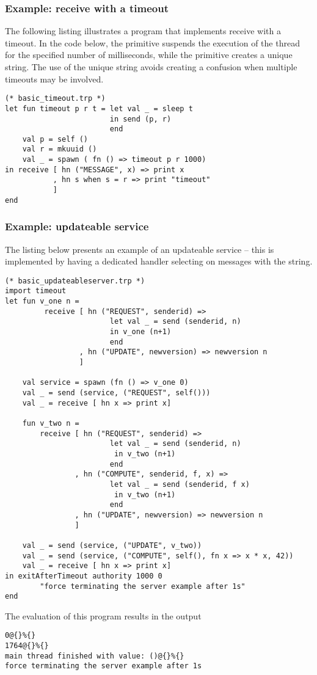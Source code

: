 \subsubsection{Example: receive with a timeout}
The following listing illustrates a program that implements
receive with a timeout. In the code below, the primitive 
suspends the execution of the thread for the specified number of milliseconds,
while the primitive  creates a unique string.
The use of the unique string avoids creating a confusion when multiple
timeouts may be involved.
\begin{lstlisting}
(* basic_timeout.trp *)
let fun timeout p r t = let val _ = sleep t
                        in send (p, r)
                        end
    val p = self () 
    val r = mkuuid () 
    val _ = spawn ( fn () => timeout p r 1000)    
in receive [ hn ("MESSAGE", x) => print x
           , hn s when s = r => print "timeout" 
           ]
end	
\end{lstlisting}

\subsubsection{Example: updateable service}
The listing below presents an example of an updateable service -- 
this is implemented by having a dedicated handler selecting on 
messages with the  string.

\begin{lstlisting}
(* basic_updateableserver.trp *)
import timeout
let fun v_one n =
         receive [ hn ("REQUEST", senderid) => 
                        let val _ = send (senderid, n) 
                        in v_one (n+1) 
                        end
                 , hn ("UPDATE", newversion) => newversion n
                 ]
                 
    val service = spawn (fn () => v_one 0)
    val _ = send (service, ("REQUEST", self()))
    val _ = receive [ hn x => print x]
                    
    fun v_two n =
        receive [ hn ("REQUEST", senderid) => 
                        let val _ = send (senderid, n) 
                         in v_two (n+1) 
                        end
                , hn ("COMPUTE", senderid, f, x) =>
                        let val _ = send (senderid, f x)
                         in v_two (n+1)
                        end
                , hn ("UPDATE", newversion) => newversion n
                ]

    val _ = send (service, ("UPDATE", v_two))
    val _ = send (service, ("COMPUTE", self(), fn x => x * x, 42))
    val _ = receive [ hn x => print x]
in exitAfterTimeout authority 1000 0 
		"force terminating the server example after 1s"
end    
\end{lstlisting}
The evaluation of this program results in the output
\begin{verbatim}
0@{}%{}
1764@{}%{}
main thread finished with value: ()@{}%{}
force terminating the server example after 1s
\end{verbatim}

